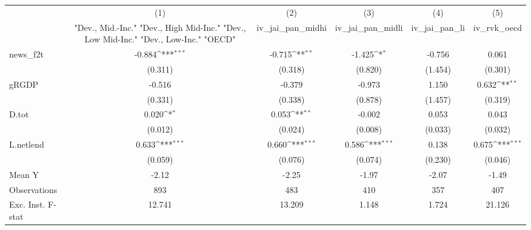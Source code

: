 {
\def\sym#1{\ifmmode^{#1}\else\(^{#1}\)\fi}
\begin{tabular}{l*{5}{c}}
\toprule
            &\multicolumn{1}{c}{(1)}&\multicolumn{1}{c}{(2)}&\multicolumn{1}{c}{(3)}&\multicolumn{1}{c}{(4)}&\multicolumn{1}{c}{(5)}\\
            &\multicolumn{1}{c}{ "Dev., Mid.-Inc." "Dev., High Mid-Inc." "Dev., Low Mid-Inc." "Dev., Low-Inc." "OECD" }&\multicolumn{1}{c}{iv\_jai\_pan\_midhi}&\multicolumn{1}{c}{iv\_jai\_pan\_midli}&\multicolumn{1}{c}{iv\_jai\_pan\_li}&\multicolumn{1}{c}{iv\_rvk\_oecd}\\
\midrule
news\_f2t    &      -0.884\sym{***}&      -0.715\sym{**} &      -1.425\sym{*}  &      -0.756         &       0.061         \\
            &     (0.311)         &     (0.318)         &     (0.820)         &     (1.454)         &     (0.301)         \\
\addlinespace
gRGDP       &      -0.516         &      -0.379         &      -0.973         &       1.150         &       0.632\sym{**} \\
            &     (0.331)         &     (0.338)         &     (0.878)         &     (1.457)         &     (0.319)         \\
\addlinespace
D.tot       &       0.020\sym{*}  &       0.053\sym{**} &      -0.002         &       0.053         &       0.043         \\
            &     (0.012)         &     (0.024)         &     (0.008)         &     (0.033)         &     (0.032)         \\
\addlinespace
L.netlend   &       0.633\sym{***}&       0.660\sym{***}&       0.586\sym{***}&       0.138         &       0.675\sym{***}\\
            &     (0.059)         &     (0.076)         &     (0.074)         &     (0.230)         &     (0.046)         \\
\midrule
Mean Y      &       -2.12         &       -2.25         &       -1.97         &       -2.07         &       -1.49         \\
Observations&         893         &         483         &         410         &         357         &         407         \\
Exc. Inst. F-stat&      12.741         &      13.209         &       1.148         &       1.724         &      21.126         \\
\bottomrule
\end{tabular}
}
